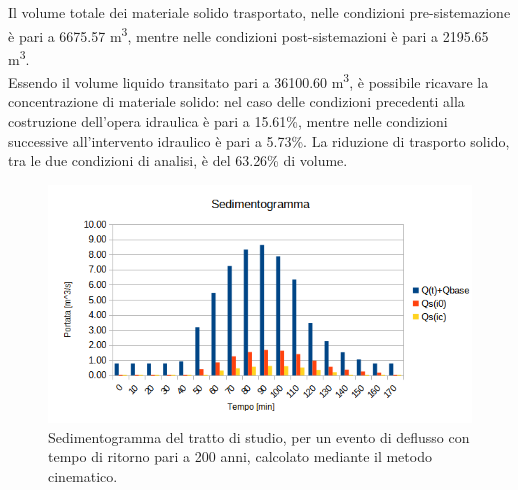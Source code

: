 Il volume totale dei materiale solido trasportato, nelle condizioni pre-sistemazione è pari a 6675.57 \unit{m^3}, mentre nelle condizioni post-sistemazioni è pari a 2195.65 \unit{m^3}.\\
Essendo il volume liquido transitato pari a 36100.60 \unit{m^3}, è possibile ricavare la concentrazione di materiale solido: nel caso delle condizioni precedenti alla costruzione dell'opera idraulica è pari a 15.61\%, mentre nelle condizioni successive all'intervento idraulico è pari a 5.73\%. La riduzione di trasporto solido, tra le due condizioni di analisi, è del 63.26\% di volume.

\begin{figure}[H] \centering
    \includegraphics[scale=0.75]{immagini/sedimentogramma.png}
    \caption{Sedimentogramma del tratto di studio, per un evento di deflusso con tempo di ritorno pari a 200 anni, calcolato mediante il metodo cinematico.}
    \label{sedimentogramma}
\end{figure}

